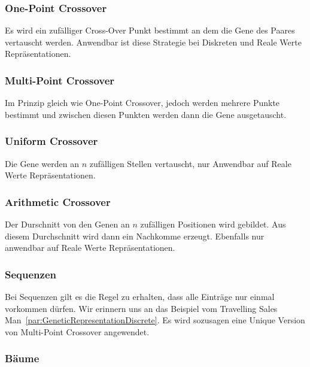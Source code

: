         \subsubsection{One-Point Crossover}

          Es wird ein zufälliger Cross-Over Punkt bestimmt an dem die Gene des Paares vertauscht werden.
          Anwendbar ist diese Strategie bei Diskreten und Reale Werte Repräsentationen.

        \subsubsection{Multi-Point Crossover}

          Im Prinzip gleich wie One-Point Crossover, jedoch werden mehrere Punkte bestimmt und
          zwischen diesen Punkten werden dann die Gene ausgetauscht.

        \subsubsection{Uniform Crossover}

          Die Gene werden an \(n\) zufälligen Stellen vertauscht, nur Anwendbar auf Reale Werte Repräsentationen.

        \subsubsection{Arithmetic Crossover}

          Der Durschnitt von den Genen an \(n\) zufälligen Positionen wird gebildet.
          Aus diesem Durchschnitt wird dann ein Nachkomme erzeugt.
          Ebenfalls nur anwendbar auf Reale Werte Repräsentationen.

        \subsubsection{Sequenzen}

          Bei Sequenzen gilt es die Regel zu erhalten, dass alle Einträge nur einmal vorkommen dürfen.
          Wir erinnern uns an das Beispiel vom Travelling Sales Man~\ref{par:GeneticRepresentationDiscrete}.
          Es wird sozusagen eine Unique Version von  Multi-Point Crossover angewendet.

        \subsubsection{Bäume}

